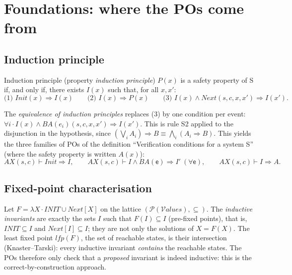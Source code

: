 \documentclass[11pt,a4paper]{article}
\newcommand{\limp}{\Rightarrow}
\newcommand{\BA}{\mathit{BA}}
\newcommand{\AX}{\mathit{AX}(s,c)}
\newcommand{\sff}[1]{\textsf{#1}}
\begin{document}
\section{Foundations: where the POs come from}

\subsection{Induction principle}
\begin{regle}{Induction principle (property \emph{induction principle})}
  $P(x)$ is a safety property of \textsc{S} if, and only if, there exists $I(x)$
  such that, for all $x,x'$:
  \[
    \text{(1) } \mathit{Init}(x)\limp I(x) \qquad
    \text{(2) } I(x)\limp P(x) \qquad
    \text{(3) } I(x)\wedge \mathit{Next}(s,c,x,x') \limp I(x').
  \]
\end{regle}
The \emph{equivalence of induction principles} replaces (3) by one condition per
event: $\forall i\cdot I(x)\wedge\BA(e_i)(s,c,x,x')\limp I(x')$. This is rule S2
applied to the disjunction in the hypothesis, since
$(\bigvee_i A_i)\limp B \equiv \bigwedge_i (A_i\limp B)$. This yields the three
families of POs of the definition ``Verification conditions for a system
\textsc{S}'' (where the safety property is written $A(x)$):
\[
  \AX\vdash \mathit{Init}\limp I, \qquad
  \AX\vdash I\wedge \BA(\sff{e})\limp I' \ (\forall \sff{e}), \qquad
  \AX\vdash I\limp A .
\]

\subsection{Fixed-point characterisation}\label{sec:pf}
Let $F = \lambda X\cdot \mathit{INIT}\cup\mathit{Next}[X]$ on the lattice
$(\mathcal{P}(\mathcal{V}\!\mathit{alues}),\subseteq)$. The \emph{inductive
invariants} are exactly the sets $I$ such that $F(I)\subseteq I$ (pre-fixed points),
that is, $\mathit{INIT}\subseteq I$ and $\mathit{Next}[I]\subseteq I$; they are not
only the solutions of $X=F(X)$. The least fixed point
$\mathit{lfp}(F)$, the set of reachable states, is their intersection
(Knaster--Tarski): every inductive invariant \emph{contains} the reachable states.
The POs therefore only check that a \emph{proposed} invariant is indeed inductive:
this is the correct-by-construction approach.
\end{document}
